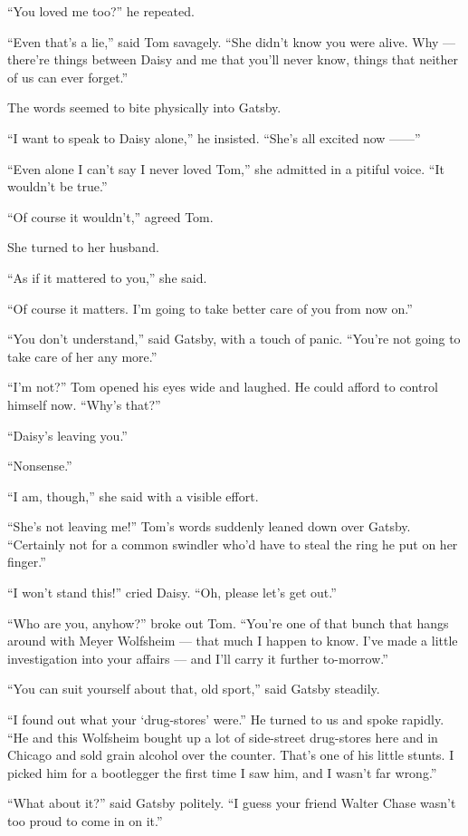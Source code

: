 \documentclass{znotebook}
\begin{document}
``You loved me too?'' he repeated.

``Even that’s a lie,'' said Tom savagely. ``She didn’t know you were alive. Why — there’re things between Daisy and me that you’ll never know, things that neither of us can ever forget.''

The words seemed to bite physically into Gatsby.

``I want to speak to Daisy alone,'' he insisted. ``She’s all excited now ——''

``Even alone I can’t say I never loved Tom,'' she admitted in a pitiful voice. ``It wouldn’t be true.''

``Of course it wouldn’t,'' agreed Tom.

She turned to her husband.

``As if it mattered to you,'' she said.

``Of course it matters. I’m going to take better care of you from now on.''

``You don’t understand,'' said Gatsby, with a touch of panic. ``You’re not going to take care of her any more.''

``I’m not?'' Tom opened his eyes wide and laughed. He could afford to control himself now. ``Why’s that?''

``Daisy’s leaving you.''

``Nonsense.''

``I am, though,'' she said with a visible effort.

``She’s not leaving me!'' Tom’s words suddenly leaned down over Gatsby. ``Certainly not for a common swindler who’d have to steal the ring he put on her finger.''

``I won’t stand this!'' cried Daisy. ``Oh, please let’s get out.''

``Who are you, anyhow?'' broke out Tom. ``You’re one of that bunch that hangs around with Meyer Wolfsheim — that much I happen to know. I’ve made a little investigation into your affairs — and I’ll carry it further to-morrow.''

``You can suit yourself about that, old sport,'' said Gatsby steadily.

``I found out what your ‘drug-stores’ were.'' He turned to us and spoke rapidly. ``He and this Wolfsheim bought up a lot of side-street drug-stores here and in Chicago and sold grain alcohol over the counter. That’s one of his little stunts. I picked him for a bootlegger the first time I saw him, and I wasn’t far wrong.''

``What about it?'' said Gatsby politely. ``I guess your friend Walter Chase wasn’t too proud to come in on it.''
\end{document}
